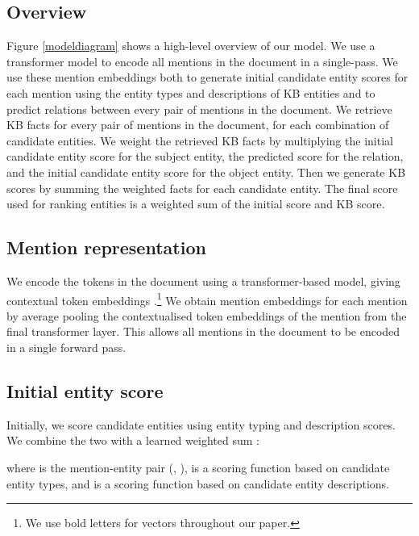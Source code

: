 \documentclass[11pt]{article}
\begin{document}
\subsection{Overview}
Figure \ref{modeldiagram} shows a high-level overview of our model. We use a transformer model to encode all mentions in the document in a single-pass. We use these mention embeddings both to generate initial candidate entity scores for each mention using the entity types and descriptions of KB entities and to predict relations between every pair of mentions in the document. We retrieve KB facts for every pair of mentions in the document, for each combination of candidate entities. We weight the retrieved KB facts by multiplying the initial candidate entity score for the subject entity, the predicted score for the relation, and the initial candidate entity score for the object entity. Then we generate KB scores by summing the weighted facts for each candidate entity. The final score used for ranking entities is a weighted sum of the initial score and KB score.

\subsection{Mention representation}
We encode the tokens in the document  using a transformer-based model, giving contextual token embeddings .\footnote{We use bold letters for vectors throughout our paper.} We obtain mention embeddings  for each mention  by average pooling the contextualised token embeddings of the mention from the final transformer layer. This allows all mentions  in the document  to be encoded in a single forward pass.

\subsection{Initial entity score }


Initially, we score candidate entities using entity typing and description scores. We combine the two with a learned weighted sum :

where  is the mention-entity pair (, ),  is a scoring function based on candidate entity types, and  is a scoring function based on candidate entity descriptions.
\end{document}
